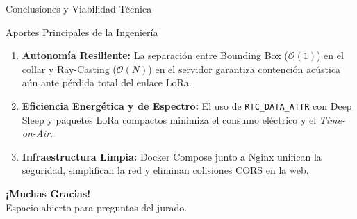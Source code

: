 \documentclass[aspectratio=43]{beamer}
\begin{document}
\begin{frame}{Conclusiones y Viabilidad Técnica}
    \begin{block}{Aportes Principales de la Ingeniería}
        \small
        \begin{enumerate}
            \item \textbf{Autonomía Resiliente:} La separación entre Bounding Box ($\mathcal{O}(1)$) en el collar y Ray-Casting ($\mathcal{O}(N)$) en el servidor garantiza contención acústica aún ante pérdida total del enlace LoRa.
            \item \textbf{Eficiencia Energética y de Espectro:} El uso de \texttt{RTC\_DATA\_ATTR} con Deep Sleep y paquetes LoRa compactos minimiza el consumo eléctrico y el \textit{Time-on-Air}.
            \item \textbf{Infraestructura Limpia:} Docker Compose junto a Nginx unifican la seguridad, simplifican la red y eliminan colisiones CORS en la web.
        \end{enumerate}
    \end{block}

    \vspace{0.2cm}
    \begin{center}
        \Large \textbf{¡Muchas Gracias!}\\
        \normalsize Espacio abierto para preguntas del jurado.
    \end{center}
\end{frame}
\end{document}
